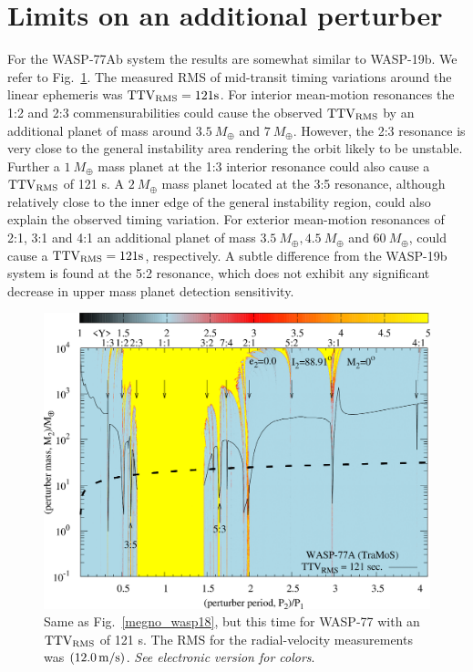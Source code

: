 \section{Limits on an additional perturber}
For the WASP-77Ab system the results are somewhat similar to WASP-19b. We refer to Fig.~\ref{megno_wasp77}. The measured RMS of mid-transit timing variations around the linear ephemeris was $\rm TTV_{\rm RMS}=121\rm s$. For interior mean-motion resonances the 1:2 and 2:3 commensurabilities could cause the observed $\rm TTV_{\rm RMS}$ by an additional planet of mass around $3.5~M_{\oplus}$ and $7~M_{\oplus}$. However, the 2:3 resonance is very close to the general instability area rendering the orbit likely to be unstable. Further a $1~M_{\oplus}$ mass planet at the 1:3 interior resonance could also cause a $\rm TTV_{\rm RMS}$ of 121 s. A $2~M_{\oplus}$ mass planet located at the 3:5 resonance, although relatively close to the inner edge of the general instability region, could also explain the observed timing variation. For exterior 
mean-motion resonances of 2:1, 3:1 and 4:1 an additional planet of mass $3.5~M_{\oplus}, 4.5~M_{\oplus}$ and $60~M_{\oplus}$, could cause a $\rm TTV_{\rm RMS}=121\rm s$, respectively. A subtle difference from the WASP-19b system is found at the 5:2 resonance, which does not exhibit any significant decrease in upper mass planet detection sensitivity.

\begin{figure}
\includegraphics[width=1.0\columnwidth]{imagenes/WASP77_TraMos_121sec_Map001_GIMP_scaled.png}
\caption{Same as Fig.~\ref{megno_wasp18}, but this time for WASP-77 with an $\rm TTV_{\rm RMS}$ of 121 s. The RMS for the radial-velocity measurements was $(12.0\,\rm m/s)$.
\emph{See electronic version for colors}.}
\label{megno_wasp77}
\end{figure}
